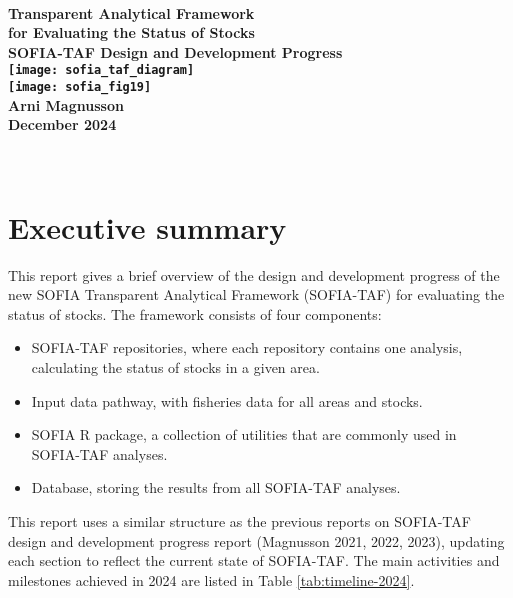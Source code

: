 \documentclass[12pt]{article}
\begin{document}
\thispagestyle{empty}

\begin{center}
  ~\\[0ex]
  \Large\bfseries Transparent Analytical Framework\\
  for Evaluating the Status of Stocks\\[1.5ex]
  \large{\rm SOFIA-TAF Design and Development Progress}\\[2.0cm]
  \texttt{[image: sofia\_taf\_diagram]}\\[1.5cm]
  \hspace{-1.5ex}\texttt{[image: sofia\_fig19]}\\[1.8cm]
  \mdseries Arni Magnusson\\[1.6ex]
  December 2024
\end{center}

\newpage

~\vspace{1em}
\setcounter{tocdepth}{2}
\tableofcontents

\newpage

\section{Executive summary}

This report gives a brief overview of the design and development progress of the
new SOFIA Transparent Analytical Framework (SOFIA-TAF) for evaluating the
status of stocks. The framework consists of four components:\\[-3ex]

\begin{itemize}
  \item SOFIA-TAF repositories, where each repository contains one analysis,\\
  calculating the status of stocks in a given area.\\[-3.5ex]
  \item Input data pathway, with fisheries data for all areas and
  stocks.\\[-3.5ex]
  \item SOFIA R package, a collection of utilities that are commonly used in\\
  SOFIA-TAF analyses.\\[-3.5ex]
  \item Database, storing the results from all SOFIA-TAF analyses.
\end{itemize}

This report uses a similar structure as the previous reports on SOFIA-TAF design
and development progress report (Magnusson 2021, 2022, 2023), updating each
section to reflect the current state of SOFIA-TAF. The main activities and
milestones achieved in 2024 are listed in Table \ref{tab:timeline-2024}.
\end{document}
